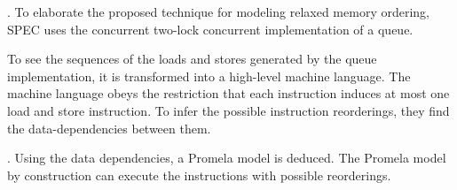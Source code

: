 . To elaborate the proposed technique
for modeling relaxed memory ordering, SPEC uses the concurrent two-lock
concurrent implementation of a queue.

To see the sequences of the loads and stores generated by the queue
implementation, it is transformed into a high-level machine language.
The machine language obeys the restriction that each instruction induces
at most one load and store instruction. To infer the possible instruction
reorderings, they find the data-dependencies between them.

. Using the data dependencies,
a Promela model is deduced. The Promela model by construction can
execute the instructions with possible reorderings.